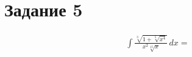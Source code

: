 \section{Задание 5}
\begin{multline*}
    \int \frac{\sqrt[3]{1+\sqrt[5]{x^4}}}{x^2 \sqrt[15]{x}} \, dx = 

\end{multline*}
